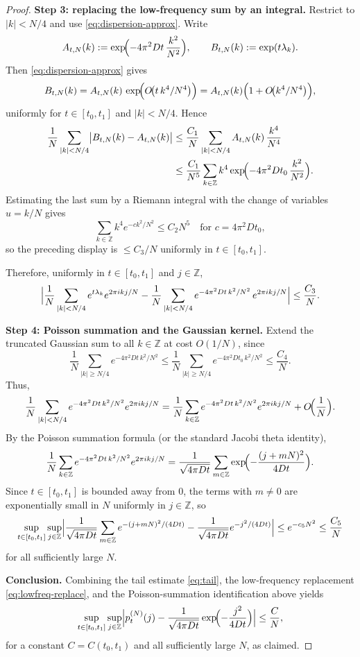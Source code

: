 \documentclass[10pt,a4paper]{amsart}
\newcommand{\Z}{\mathbb{Z}}
\begin{document}
\begin{proof}
\smallskip
\noindent\textbf{Step 3: replacing the low-frequency sum by an integral.}
Restrict to $|k|<N/4$ and use \eqref{eq:dispersion-approx}. Write
\[
A_{t,N}(k):=\exp\!\Bigl(-4\pi^2 D t\,\frac{k^2}{N^2}\Bigr),
\qquad
B_{t,N}(k):=\exp(t\lambda_k).
\]
Then \eqref{eq:dispersion-approx} gives
\[
B_{t,N}(k)=A_{t,N}(k)\,\exp\!\Bigl(O\!\bigl(t\,k^4/N^4\bigr)\Bigr)
=
A_{t,N}(k)\Bigl(1+O\!\bigl(k^4/N^4\bigr)\Bigr),
\]
uniformly for $t\in[t_0,t_1]$ and $|k|<N/4$. Hence
\begin{align*}
\frac{1}{N}\sum_{|k|<N/4}\bigl|B_{t,N}(k)-A_{t,N}(k)\bigr|
&\le
\frac{C_1}{N}\sum_{|k|<N/4}A_{t,N}(k)\,\frac{k^4}{N^4}\\
&\le
\frac{C_1}{N^5}\sum_{k\in\Z}k^4\exp\!\Bigl(-4\pi^2 D t_0\,\frac{k^2}{N^2}\Bigr).
\end{align*}
Estimating the last sum by a Riemann integral with the change of variables $u=k/N$ gives
\[
\sum_{k\in\Z}k^4 e^{-c k^2/N^2}
\le
C_2 N^5
\quad\text{for }c=4\pi^2Dt_0,
\]
so the preceding display is $\le C_3/N$ uniformly in $t\in[t_0,t_1]$.

Therefore, uniformly in $t\in[t_0,t_1]$ and $j\in\Z$,
\begin{equation}\label{eq:lowfreq-replace}
\Bigl|
\frac{1}{N}\sum_{|k|<N/4}e^{t\lambda_k}e^{2\pi i k j/N}
-
\frac{1}{N}\sum_{|k|<N/4}e^{-4\pi^2 D t\,k^2/N^2}\,e^{2\pi i k j/N}
\Bigr|
\le
\frac{C_3}{N}.
\end{equation}

\smallskip
\noindent\textbf{Step 4: Poisson summation and the Gaussian kernel.}
Extend the truncated Gaussian sum to all $k\in\Z$ at cost $O(1/N)$, since
\[
\frac{1}{N}\sum_{|k|\ge N/4}e^{-4\pi^2Dt\,k^2/N^2}
\le
\frac{1}{N}\sum_{|k|\ge N/4}e^{-4\pi^2Dt_0\,k^2/N^2}
\le
\frac{C_4}{N}.
\]
Thus,
\[
\frac{1}{N}\sum_{|k|<N/4}e^{-4\pi^2 D t\,k^2/N^2}e^{2\pi i k j/N}
=
\frac{1}{N}\sum_{k\in\Z}e^{-4\pi^2 D t\,k^2/N^2}e^{2\pi i k j/N}
+O\!\Bigl(\frac{1}{N}\Bigr).
\]
By the Poisson summation formula (or the standard Jacobi theta identity),
\[
\frac{1}{N}\sum_{k\in\Z}e^{-4\pi^2 D t\,k^2/N^2}e^{2\pi i k j/N}
=
\frac{1}{\sqrt{4\pi Dt}}
\sum_{m\in\Z}\exp\!\Bigl(-\frac{(j+mN)^2}{4Dt}\Bigr).
\]
Since $t\in[t_0,t_1]$ is bounded away from $0$, the terms with $m\neq0$ are exponentially small in
$N$ uniformly in $j\in\Z$, so
\[
\sup_{t\in[t_0,t_1]}\sup_{j\in\Z}
\Bigl|
\frac{1}{\sqrt{4\pi Dt}}
\sum_{m\in\Z}e^{-(j+mN)^2/(4Dt)}
-
\frac{1}{\sqrt{4\pi Dt}}e^{-j^2/(4Dt)}
\Bigr|
\le
e^{-c_5 N^2}
\le
\frac{C_5}{N}
\]
for all sufficiently large $N$.

\smallskip
\noindent\textbf{Conclusion.}
Combining the tail estimate \eqref{eq:tail}, the low-frequency replacement
\eqref{eq:lowfreq-replace}, and the Poisson-summation identification above yields
\[
\sup_{t\in[t_0,t_1]}\sup_{j\in\Z}
\Bigl|
p_t^{(N)}(j)
-
\frac{1}{\sqrt{4\pi Dt}}\exp\!\Bigl(-\frac{j^2}{4Dt}\Bigr)
\Bigr|
\le
\frac{C}{N},
\]
for a constant $C=C(t_0,t_1)$ and all sufficiently large $N$, as claimed.
\end{proof}
\end{document}
